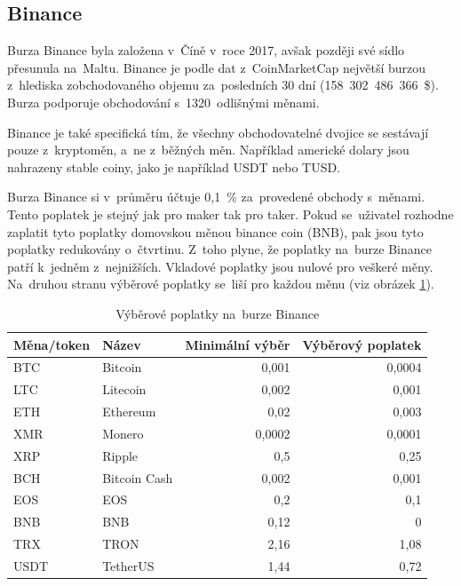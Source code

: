 \documentclass[thesis=B,czech]{FITthesis}[2019/03/21]
\begin{document}
\subsection{Binance}
Burza Binance byla založena v~Číně v~roce 2017, avšak později své sídlo přesunula na~Maltu. Binance je podle dat z~CoinMarketCap největší burzou z~hlediska zobchodovaného objemu za~posledních 30 dní (158~302~486~366~\$). \cite{coinmarketcap} Burza podporuje obchodování s~1320~odlišnými měnami.

Binance je také specifická tím, že všechny obchodovatelné dvojice se  \linebreak sestávají pouze z~kryptoměn, a~ne z~běžných měn. Například americké dolary jsou nahrazeny stable coiny, jako je například USDT nebo TUSD. 

Burza Binance si v~průměru účtuje 0,1~\% za~provedené obchody s~měnami. Tento poplatek je stejný jak pro maker tak pro taker. Pokud se~uživatel rozhodne zaplatit tyto poplatky domovskou měnou binance coin (BNB), pak jsou tyto poplatky redukovány o~čtvrtinu. Z~toho plyne, že poplatky na~burze Binance patří k~jedněm z~nejnižších. Vkladové poplatky jsou nulové pro veškeré měny. Na~druhou stranu výběrové poplatky se~liší pro každou měnu (viz obrázek \ref{binance_fees}). \cite{blockonomi_binance}

\begin{table}\centering
    \caption{Výběrové poplatky na~burze Binance \cite{binance_fees}}
    \label{binance_fees}
     \begin{tabular}{||l | l | r | r||} 
     \hline
     Měna/token & Název & Minimální výběr & Výběrový poplatek \\ [0.5ex] 
     \hline\hline
     BTC & Bitcoin & 0,001 & 0,0004 \\ 
     \hline
     LTC & Litecoin & 0,002 & 0,001 \\
     \hline
     ETH & Ethereum & 0,02 & 0,003 \\
     \hline
     XMR & Monero & 0,0002 & 0,0001 \\
     \hline
     XRP & Ripple & 0,5 & 0,25 \\
     \hline
     BCH & Bitcoin Cash & 0,002 & 0,001 \\
     \hline
     EOS & EOS & 0,2 & 0,1 \\
     \hline
     BNB & BNB & 0,12 & 0 \\
     \hline
     TRX & TRON & 2,16 & 1,08 \\
     \hline
     USDT & TetherUS & 1,44 & 0,72 \\
     \hline
    \end{tabular}
\end{table}
\end{document}
